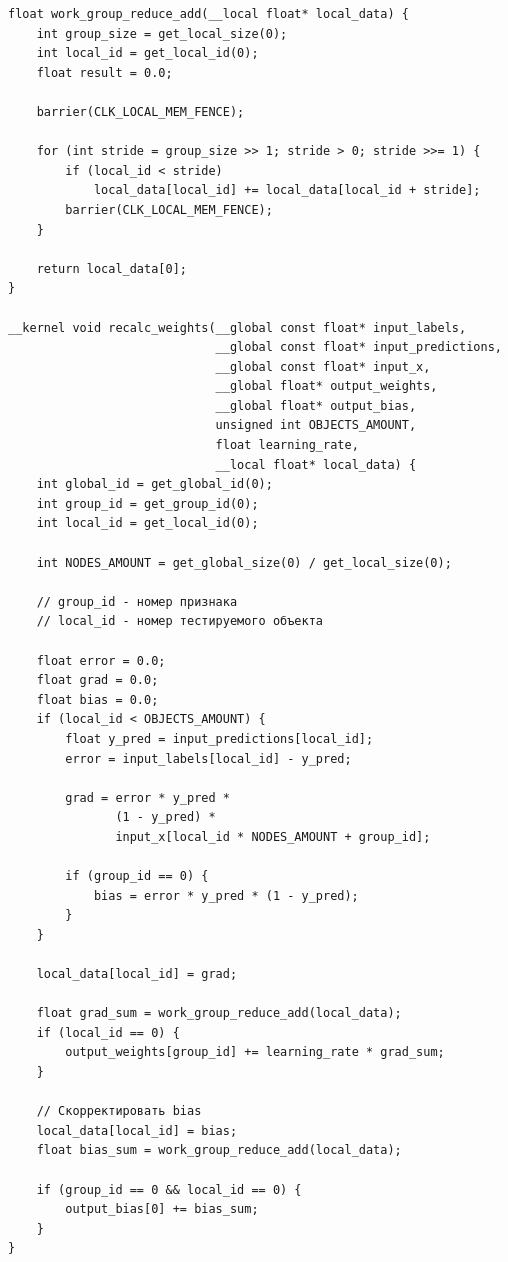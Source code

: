 \documentclass[a4paper,14pt]{extarticle}
\begin{document}
\begin{verbatim}
float work_group_reduce_add(__local float* local_data) {
    int group_size = get_local_size(0);
    int local_id = get_local_id(0);
    float result = 0.0;
    
    barrier(CLK_LOCAL_MEM_FENCE);
    
    for (int stride = group_size >> 1; stride > 0; stride >>= 1) {
        if (local_id < stride)
            local_data[local_id] += local_data[local_id + stride];
        barrier(CLK_LOCAL_MEM_FENCE);
    }
    
    return local_data[0];
}

__kernel void recalc_weights(__global const float* input_labels,
                             __global const float* input_predictions,
                             __global const float* input_x,
                             __global float* output_weights,
                             __global float* output_bias,
                             unsigned int OBJECTS_AMOUNT,
                             float learning_rate,
                             __local float* local_data) {
    int global_id = get_global_id(0);
    int group_id = get_group_id(0);
    int local_id = get_local_id(0);

    int NODES_AMOUNT = get_global_size(0) / get_local_size(0);

    // group_id - номер признака
    // local_id - номер тестируемого объекта

    float error = 0.0;
    float grad = 0.0;
    float bias = 0.0;
    if (local_id < OBJECTS_AMOUNT) {
        float y_pred = input_predictions[local_id];
        error = input_labels[local_id] - y_pred;

        grad = error * y_pred * 
               (1 - y_pred) *
               input_x[local_id * NODES_AMOUNT + group_id];
        
        if (group_id == 0) {
            bias = error * y_pred * (1 - y_pred);
        }
    }

    local_data[local_id] = grad;

    float grad_sum = work_group_reduce_add(local_data);
    if (local_id == 0) {
        output_weights[group_id] += learning_rate * grad_sum;
    }

    // Скорректировать bias
    local_data[local_id] = bias;
    float bias_sum = work_group_reduce_add(local_data);

    if (group_id == 0 && local_id == 0) {
        output_bias[0] += bias_sum;
    }
}
\end{verbatim}
\end{document}
